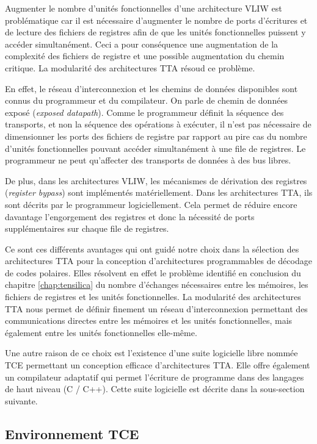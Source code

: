 Augmenter le nombre d'unités fonctionnelles d'une architecture VLIW est problématique car il est nécessaire d'augmenter le nombre de ports d'écritures et de lecture des fichiers de registres afin de que les unités fonctionnelles puissent y accéder simultanément. Ceci a pour conséquence une augmentation de la complexité des fichiers de registre et une possible augmentation du chemin critique.
La modularité des architectures TTA résoud ce problème.

En effet, le réseau d'interconnexion et les chemins de données disponibles sont connus du programmeur et du compilateur. On parle de \og chemin de données exposé \fg (\textit{exposed datapath}). Comme le programmeur définit la séquence des transports, et non la séquence des opérations à exécuter, il n'est pas nécessaire de dimensionner les ports des fichiers de registre par rapport au pire cas du nombre d'unités fonctionnelles pouvant accéder simultanément à une file de registres. Le programmeur ne peut qu'affecter des transports de données à des bus libres.

De plus, dans les architectures VLIW, les mécanismes de dérivation des registres (\textit{register bypass}) sont implémentés matériellement. Dans les architectures TTA, ils sont décrits par le programmeur logiciellement. Cela permet de réduire encore davantage l'engorgement des registres et donc la nécessité de ports supplémentaires sur chaque file de registres.

Ce sont ces différents avantages qui ont guidé notre choix dans la sélection des architectures TTA pour la conception d'architectures programmables de décodage de codes polaires. Elles résolvent en effet le problème identifié en conclusion du chapitre \ref{chap:tensilica} du nombre d'échanges nécessaires entre les mémoires, les fichiers de registres et les unités fonctionnelles. La modularité des architectures TTA nous permet de définir finement un réseau d'interconnexion permettant des communications directes entre les mémoires et les unités fonctionnelles, mais également entre les unités fonctionnelles elle-même.

Une autre raison de ce choix est l'existence d'une suite logicielle libre nommée TCE permettant un conception efficace d'architectures TTA. Elle offre également un compilateur adaptatif qui permet l'écriture de programme dans des langages de haut niveau (C / C++). Cette suite logicielle est décrite dans la sous-section suivante.


\subsection{Environnement TCE}

